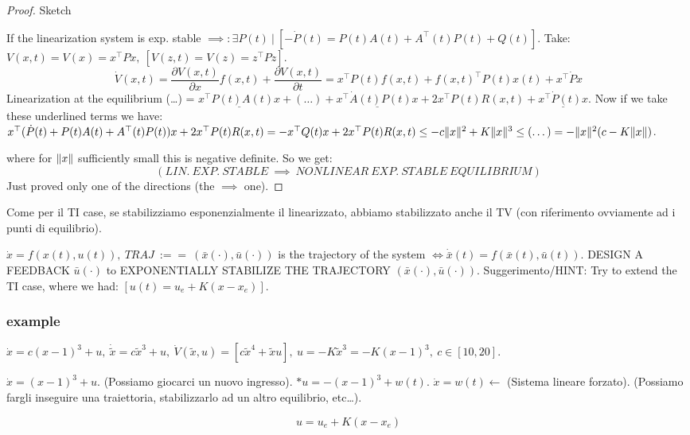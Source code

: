 \begin{proof}{Sketch}

If the linearization system is exp. stable $\implies: \exists P(t)\ |\ [-\dot{P}(t) = P(t)A(t) + A^\top (t)P(t) + Q(t)]$. Take: $V(x,t) = V(x) = x^\top Px,\ [V(z,t) = V(z) = z^\top Pz]$.
\[
	\dot{V}(x,t) = \frac{\partial{V(x,t)}}{\partial{x}}f(x,t) + \frac{\partial{V(x,t)}}{\partial{t}} = x^\top P(t)f(x,t) + f(x,t)^\top P(t)x(t) + x^\top \dot{P}x
\]
Linearization at the equilibrium (\dots) = $\underline{x^\top P(t)A(t)x} + (\dots) + \underline{x^\top \dot{A}(t)P(t)x} + 2x^\top P(t)R(x,t) + \underline{x^\top \dot{P}(t)x}$. Now if we take these underlined terms we have:
$x^\top (\dot{P}(t) + P(t)A(t) + A^\top (t)P(t))x + 2x^\top P(t)R(x,t) = -x^\top Q(t)x + 2x^\top P(t)R(x,t) \leq -c\lVert x\rVert^2 + K\lVert x\rVert^3 \leq (\dots) = -\lVert x\rVert^2(c-K\lVert x\rVert)$.

where for $\lVert x\rVert$ sufficiently small this is negative definite. So we get:
\[
	(LIN.\ EXP.\ STABLE\ \implies\ NONLINEAR\ EXP.\ STABLE\ EQUILIBRIUM)
\]	
Just proved only one of the directions (the $\implies$ one).
\end{proof}

Come per il TI case, se stabilizziamo esponenzialmente il linearizzato, abbiamo stabilizzato anche il TV (con riferimento ovviamente ad i punti di equilibrio).

$\dot{x}=f(x(t),u(t)),\ TRAJ\ :==\ (\bar{x}(\mathord{\cdot}), \bar{u}(\mathord{\cdot}))$ is the trajectory of the system $\iff \dot{\bar{x}}(t) = f(\bar{x}(t),\bar{u}(t))$. DESIGN A FEEDBACK $\bar{u}(\mathord{\cdot})$ to EXPONENTIALLY STABILIZE THE TRAJECTORY $(\bar{x}(\mathord{\cdot}), \bar{u}(\mathord{\cdot}))$. Suggerimento/HINT: Try to extend the TI case, where we had: $[u(t) = u_e + K(x-x_e)]$.

\subsubsection{example}

$\dot{x}=c(x-1)^3 + u,\ \dot{\tilde{x}} = c\tilde{x}^3 + u,\ \dot{V}(\tilde{x},u) = [c\tilde{x}^4 + \tilde{x}u],\ u=-K\tilde{x}^3 = -K(x-1)^3,\ c \in [10,20]$.

$\dot{x}=(x-1)^3 + u$. (Possiamo giocarci un nuovo ingresso).
$* u=-(x-1)^3 + w(t)$. $\dot{x}=w(t) \leftarrow$ (Sistema lineare forzato). (Possiamo fargli inseguire una traiettoria, stabilizzarlo ad un altro equilibrio, etc\dots).

\[
	u = u_e + K(x-x_e)
\]


